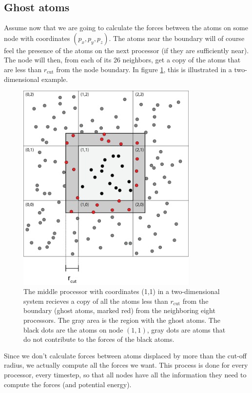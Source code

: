 \subsection{Ghost atoms}
Assume now that we are going to calculate the forces between the atoms on some node with coordinates $(p_x, p_y, p_z)$. The atoms near the boundary will of course feel the presence of the atoms on the next processor (if they are sufficiently near). The node will then, from each of its 26 neighbors, get a copy of the atoms that are less than $r_\text{cut}$ from the node boundary. In figure \ref{fig:md_ghost_atoms}, this is illustrated in a two-dimensional example.
\begin{figure}[h]
\begin{center}
\includegraphics[width=0.8\textwidth, trim=0cm 0cm 0cm 0cm, clip]{MD/figures/parallelization_ghost_atoms.eps}
\end{center}
\caption{The middle processor with coordinates (1,1) in a two-dimensional system recieves a copy of all the atoms less than $r_\text{cut}$ from the boundary (ghost atoms, marked red) from the neighboring eight processors. The gray area is the region with the ghost atoms. The black dots are the atoms on node $(1,1)$, gray dots are atoms that do not contribute to the forces of the black atoms.}
\label{fig:md_ghost_atoms}
\end{figure}
Since we don't calculate forces between atoms displaced by more than the cut-off radius, we actually compute all the forces we want. This process is done for every processor, every timestep, so that all nodes have all the information they need to compute the forces (and potential energy).
